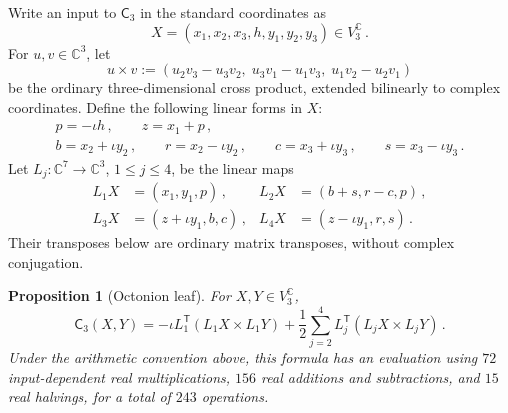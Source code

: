 \documentclass[11pt,reqno]{amsart}
\numberwithin{equation}{section}
\newtheorem{proposition}{Proposition}[section]
\newcommand{\C}{\mathbb C}
\newcommand{\AltC}{\mathsf C}
\begin{document}
Write an input to $\AltC_3$ in the standard coordinates as
\[
X=(x_1,x_2,x_3,h,y_1,y_2,y_3)\in V_3^{\C}\,.
\]
For $u,v\in\C^3$, let
\[
u\times v:=(u_2v_3-u_3v_2,\;u_3v_1-u_1v_3,\;u_1v_2-u_2v_1)
\]
be the ordinary three-dimensional cross product, extended bilinearly to
complex coordinates. Define the following linear forms in $X$:
\[
\begin{gathered}
p=-\iota h\,,\qquad z=x_1+p\,,\\
b=x_2+\iota y_2\,,\qquad r=x_2-\iota y_2\,,\qquad
c=x_3+\iota y_3\,,\qquad s=x_3-\iota y_3\,.
\end{gathered}
\]
Let $L_j\colon\C^7\to\C^3$, $1\le j\le4$, be the linear maps
\begin{equation}\label{eq:octonion-linear-maps}
\begin{aligned}
L_1X&=(x_1,y_1,p)\,,
& L_2X&=(b+s,r-c,p)\,,\\
L_3X&=(z+\iota y_1,b,c)\,,
& L_4X&=(z-\iota y_1,r,s)\,.
\end{aligned}
\end{equation}
Their transposes below are ordinary matrix transposes, without complex
conjugation.

\begin{proposition}[Octonion leaf]\label{prop:octonion-leaf}
For $X,Y\in V_3^{\C}$,
\begin{equation}\label{eq:octonion-leaf}
\AltC_3(X,Y)
=-\iota L_1^{\mathsf T}(L_1X\times L_1Y)
 +\frac12\sum_{j=2}^4L_j^{\mathsf T}(L_jX\times L_jY)\,.
\end{equation}
Under the arithmetic convention above,
this formula has an evaluation using $72$ input-dependent real
multiplications, $156$ real additions and subtractions, and $15$ real
halvings, for a total of $243$ operations.
\end{proposition}
\end{document}
